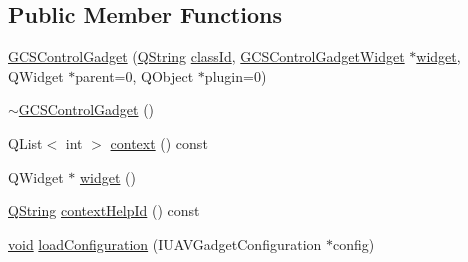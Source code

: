 \subsection*{\-Public \-Member \-Functions}
\begin{DoxyCompactItemize}
\item 
\hyperlink{group___g_c_s_control_gadget_plugin_gaa2bb4808899771140d27bd47b54ccb8c}{\-G\-C\-S\-Control\-Gadget} (\hyperlink{group___u_a_v_objects_plugin_gab9d252f49c333c94a72f97ce3105a32d}{\-Q\-String} \hyperlink{group___core_plugin_ga3878fde66a57220608960bcc3fbeef2c}{class\-Id}, \hyperlink{class_g_c_s_control_gadget_widget}{\-G\-C\-S\-Control\-Gadget\-Widget} $\ast$\hyperlink{group___g_c_s_control_gadget_plugin_ga36c99e15ded265f21ddeb3b0ef9a344f}{widget}, \-Q\-Widget $\ast$parent=0, \-Q\-Object $\ast$plugin=0)
\item 
\hyperlink{group___g_c_s_control_gadget_plugin_ga109d324fea74699d89e95ea779cd7c18}{$\sim$\-G\-C\-S\-Control\-Gadget} ()
\item 
\-Q\-List$<$ int $>$ \hyperlink{group___g_c_s_control_gadget_plugin_gaebdfdbcaa43f61addf35752163d359d7}{context} () const 
\item 
\-Q\-Widget $\ast$ \hyperlink{group___g_c_s_control_gadget_plugin_ga36c99e15ded265f21ddeb3b0ef9a344f}{widget} ()
\item 
\hyperlink{group___u_a_v_objects_plugin_gab9d252f49c333c94a72f97ce3105a32d}{\-Q\-String} \hyperlink{group___g_c_s_control_gadget_plugin_ga5be6c84c2994367f7f86e3553cf68b19}{context\-Help\-Id} () const 
\item 
\hyperlink{group___u_a_v_objects_plugin_ga444cf2ff3f0ecbe028adce838d373f5c}{void} \hyperlink{group___g_c_s_control_gadget_plugin_ga439722d2b4016bbfaad9486b20c35a1a}{load\-Configuration} (\-I\-U\-A\-V\-Gadget\-Configuration $\ast$config)
\end{DoxyCompactItemize}
